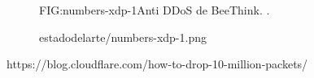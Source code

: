\begin{figure}[Anti DDoS de BeeThink.]{FIG:numbers-xdp-1}{Anti DDoS de BeeThink. \cite{numbers-xdp-1}.}
  \begin{image}{}{}{estadodelarte/numbers-xdp-1.png}
  \end{image}
\end{figure}

https://blog.cloudflare.com/how-to-drop-10-million-packets/